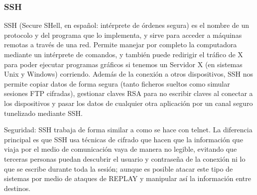 \documentclass[spanish]{article}
\begin{document}
\subsubsection{SSH}
SSH (Secure SHell, en español: intérprete de órdenes segura) es el nombre de un protocolo y del programa que lo implementa, y sirve para acceder a máquinas remotas a través de una red. Permite manejar por completo la computadora mediante un intérprete de comandos, y también puede redirigir el tráfico de X para poder ejecutar programas gráficos si tenemos un Servidor X (en sistemas Unix y Windows) corriendo.
Además de la conexión a otros dispositivos, SSH nos permite copiar datos de forma segura (tanto ficheros sueltos como simular sesiones FTP cifradas), gestionar claves RSA para no escribir claves al conectar a los dispositivos y pasar los datos de cualquier otra aplicación por un canal seguro tunelizado mediante SSH.

Seguridad: SSH trabaja de forma similar a como se hace con telnet. La diferencia principal es que SSH usa técnicas de cifrado que hacen que la información que viaja por el medio de comunicación vaya de manera no legible, evitando que terceras personas puedan descubrir el usuario y contraseña de la conexión ni lo que se escribe durante toda la sesión; aunque es posible atacar este tipo de sistemas por medio de ataques de REPLAY y manipular así la información entre destinos.
\end{document}
